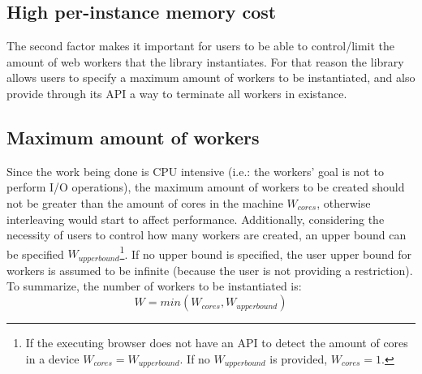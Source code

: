 \subsection{High per-instance memory cost}
The second factor makes it important for users to be able to control/limit the amount of web workers that the library instantiates. For that reason the library allows users to specify a maximum amount of workers to be instantiated, and also provide through its API a way to terminate all workers in existance.

\subsection{Maximum amount of workers}
Since the work being done is CPU intensive (i.e.: the workers' goal is not to perform I/O operations), the maximum amount of workers to be created should not be greater than the amount of cores in the machine \(W_{cores}\), otherwise interleaving would start to affect performance. Additionally, considering the necessity of users to control how many workers are created, an upper bound can be specified \(W_{upper bound}\)\footnote{If the executing browser does not have an API to detect the amount of cores in a device \(W_{cores}=W_{upper bound}\). If no \(W_{upper bound}\) is provided, \(W_{cores}=1\).}. If no upper bound is specified, the user upper bound for workers is assumed to be infinite (because the user is not providing a restriction). To summarize, the number of workers to be instantiated is:
\[W = min(W_{cores}, W_{upper bound})\]

\pagebreak